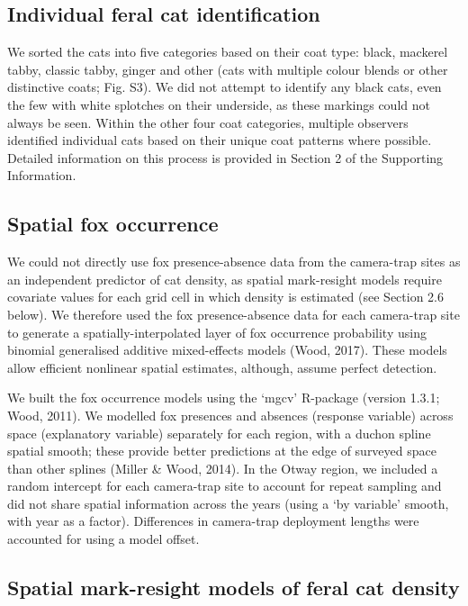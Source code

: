 \documentclass[]{elsarticle} %
\begin{document}
\hypertarget{individual-feral-cat-identification}{%
\subsection{Individual feral cat identification}\label{individual-feral-cat-identification}}

We sorted the cats into five categories based on their coat type: black, mackerel tabby, classic tabby, ginger and other (cats with multiple colour blends or other distinctive coats; Fig. S3). We did not attempt to identify any black cats, even the few with white splotches on their underside, as these markings could not always be seen. Within the other four coat categories, multiple observers identified individual cats based on their unique coat patterns where possible. Detailed information on this process is provided in Section 2 of the Supporting Information.

\hypertarget{spatial-fox-occurrence}{%
\subsection{Spatial fox occurrence}\label{spatial-fox-occurrence}}

We could not directly use fox presence-absence data from the camera-trap sites as an independent predictor of cat density, as spatial mark-resight models require covariate values for each grid cell in which density is estimated (see Section 2.6 below). We therefore used the fox presence-absence data for each camera-trap site to generate a spatially-interpolated layer of fox occurrence probability using binomial generalised additive mixed-effects models (Wood, 2017). These models allow efficient nonlinear spatial estimates, although, assume perfect detection.

We built the fox occurrence models using the `mgcv' R-package (version 1.3.1; Wood, 2011). We modelled fox presences and absences (response variable) across space (explanatory variable) separately for each region, with a duchon spline spatial smooth; these provide better predictions at the edge of surveyed space than other splines (Miller \& Wood, 2014). In the Otway region, we included a random intercept for each camera-trap site to account for repeat sampling and did not share spatial information across the years (using a `by variable' smooth, with year as a factor). Differences in camera-trap deployment lengths were accounted for using a model offset.

\hypertarget{spatial-mark-resight-models-of-feral-cat-density}{%
\subsection{Spatial mark-resight models of feral cat density}\label{spatial-mark-resight-models-of-feral-cat-density}}
\end{document}
